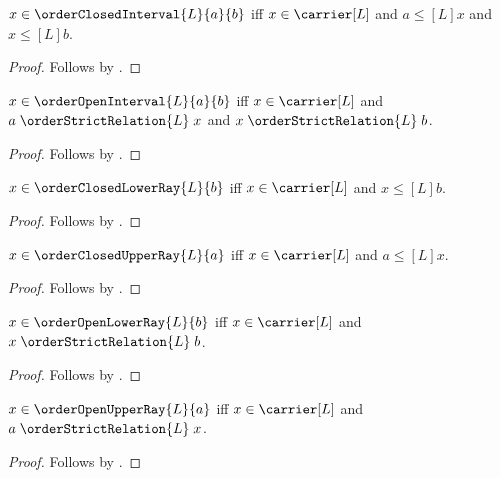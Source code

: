 \begin{proposition}\label{order_closed_interval_iff}
    $x\in\orderClosedInterval{L}{a}{b}$ iff
        $x\in\carrier[L]$ and $a\mathrel{\leq[L]}x$ and
        $x\mathrel{\leq[L]}b$.
\end{proposition}
\begin{proof}
    Follows by .
\end{proof}

\begin{proposition}\label{order_open_interval_iff}
    $x\in\orderOpenInterval{L}{a}{b}$ iff
        $x\in\carrier[L]$ and
        $a\mathrel{\orderStrictRelation{L}}x$ and
        $x\mathrel{\orderStrictRelation{L}}b$.
\end{proposition}
\begin{proof}
    Follows by .
\end{proof}

\begin{proposition}\label{order_closed_lower_ray_iff}
    $x\in\orderClosedLowerRay{L}{b}$ iff
        $x\in\carrier[L]$ and $x\mathrel{\leq[L]}b$.
\end{proposition}
\begin{proof}
    Follows by .
\end{proof}

\begin{proposition}\label{order_closed_upper_ray_iff}
    $x\in\orderClosedUpperRay{L}{a}$ iff
        $x\in\carrier[L]$ and $a\mathrel{\leq[L]}x$.
\end{proposition}
\begin{proof}
    Follows by .
\end{proof}

\begin{proposition}\label{order_open_lower_ray_iff}
    $x\in\orderOpenLowerRay{L}{b}$ iff
        $x\in\carrier[L]$ and
        $x\mathrel{\orderStrictRelation{L}}b$.
\end{proposition}
\begin{proof}
    Follows by .
\end{proof}

\begin{proposition}\label{order_open_upper_ray_iff}
    $x\in\orderOpenUpperRay{L}{a}$ iff
        $x\in\carrier[L]$ and
        $a\mathrel{\orderStrictRelation{L}}x$.
\end{proposition}
\begin{proof}
    Follows by .
\end{proof}

